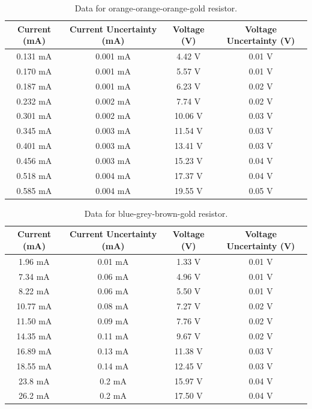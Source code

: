 \documentclass[11pt]{article}
\begin{document}
\begin{table}[htb]
    \caption{\label{tab:tab2}Data for orange-orange-orange-gold resistor.}
    \vspace{1em}\hline\hline\vspace{0.3em}\centering
    \begin{tabular}{cccc}
        Current (mA)&Current Uncertainty (mA)&Voltage (V)&Voltage Uncertainty (V)\\
        \hline
0.131 mA&0.001 mA&4.42 V&0.01 V\\
0.170 mA&0.001 mA&5.57 V&0.01 V\\
0.187 mA&0.001 mA&6.23 V&0.02 V\\
0.232 mA&0.002 mA&7.74 V&0.02 V\\
0.301 mA&0.002 mA&10.06 V&0.03 V\\
0.345 mA&0.003 mA&11.54 V&0.03 V\\
0.401 mA&0.003 mA&13.41 V&0.03 V\\
0.456 mA&0.003 mA&15.23 V&0.04 V\\
0.518 mA&0.004 mA&17.37 V&0.04 V\\
0.585 mA&0.004 mA&19.55 V&0.05 V\\

    \end{tabular}
    \hline\hline
\end{table}

\begin{table}[htb]
    \caption{\label{tab:tab3}Data for blue-grey-brown-gold resistor.}
    \vspace{1em}\hline\hline\vspace{0.3em}\centering
    \begin{tabular}{cccc}
        Current (mA)&Current Uncertainty (mA)&Voltage (V)&Voltage Uncertainty (V)\\
        \hline

1.96 mA&0.01 mA&1.33 V&0.01 V\\
7.34 mA&0.06 mA&4.96 V&0.01 V\\
8.22 mA&0.06 mA&5.50 V&0.01 V\\
10.77 mA&0.08 mA&7.27 V&0.02 V\\
11.50 mA&0.09 mA&7.76 V&0.02 V\\
14.35 mA&0.11 mA&9.67 V&0.02 V\\
16.89 mA&0.13 mA&11.38 V&0.03 V\\
18.55 mA&0.14 mA&12.45 V&0.03 V\\
23.8 mA&0.2 mA&15.97 V&0.04 V\\
26.2 mA&0.2 mA&17.50 V&0.04 V\\

    \end{tabular}
    \hline\hline
\end{table}
\end{document}
